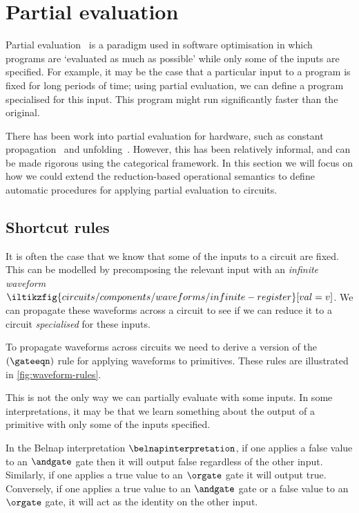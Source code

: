 \section{Partial evaluation}\label{sec:partial}

Partial evaluation~\cite{jones1996introduction} is a paradigm used in software
optimisation in which programs are `evaluated as much as possible' while only
some of the inputs are specified.
For example, it may be the case that a particular input to a program is fixed
for long periods of time; using partial evaluation, we can define a program
specialised for this input.
This program might run significantly faster than the original.

There has been work into partial evaluation for hardware, such as constant
propagation~\cite{singh1996expressing,singh1999partial} and
unfolding~\cite{thompson2006bitlevel}.
However, this has been relatively informal, and can be made rigorous using the
categorical framework.
In this section we will focus on how we could extend the reduction-based
operational semantics to define automatic procedures for applying partial
evaluation to circuits.

\subsection{Shortcut rules}\label{sec:shortcut}

It is often the case that we know that some of the inputs to a circuit are
fixed.
This can be modelled by precomposing the relevant input with an
\emph{infinite waveform} \(
\iltikzfig{circuits/components/waveforms/infinite-register}[val=v]
\).
We can propagate these waveforms across a circuit to see if we can reduce it to
a circuit \emph{specialised} for these inputs.

To propagate waveforms across circuits we need to derive a version of the
\((\gateeqn)\) rule for applying waveforms to primitives.
These rules are illustrated in \cref{fig:waveform-rules}.



This is not the only way we can partially evaluate with some inputs.
In some interpretations, it may be that we learn something about the output of
a primitive with only some of the inputs specified.

\begin{example}
    In the Belnap interpretation \(\belnapinterpretation\), if one applies a
    false value to an \(\andgate\) gate then it will output false regardless of
    the other input.
    Similarly, if one applies a true value to an \(\orgate\) gate it will output
    true.
    Conversely, if one applies a true value to an \(\andgate\) gate or a false
    value to an \(\orgate\) gate, it will act as the identity on the other
    input.
\end{example}

